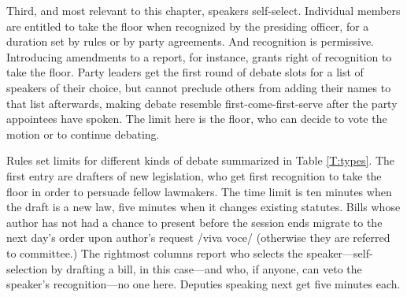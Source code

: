 \documentclass[letter,12pt]{article}
\begin{document}
Third, and most relevant to this chapter, speakers self-select. Individual members are entitled to take the floor when recognized by the presiding officer, for a duration set by rules or by party agreements. And recognition is permissive. Introducing amendments to a report, for instance, grants right of recognition to take the floor. Party leaders get the first round of debate slots for a list of speakers of their choice, but cannot preclude others from adding their names to that list afterwards, making debate resemble first-come-first-serve after the party appointees have spoken. The limit here is the floor, who can decide to vote the motion or to continue debating. 



Rules set limits for different kinds of debate summarized in Table \ref{T:types}. The first entry are drafters of new legislation, who get first recognition to take the floor in order to persuade fellow lawmakers. The time limit is ten minutes when the draft is a new law, five minutes when it changes existing statutes. Bills whose author has not had a chance to present before the session ends migrate to the next day's order upon author's request /viva voce/ (otherwise they are referred to committee.) The rightmost columns report who selects the speaker---self-selection by drafting a bill, in this case---and who, if anyone, can veto the speaker's recognition---no one here. Deputies speaking next get five minutes each. 
\end{document}
